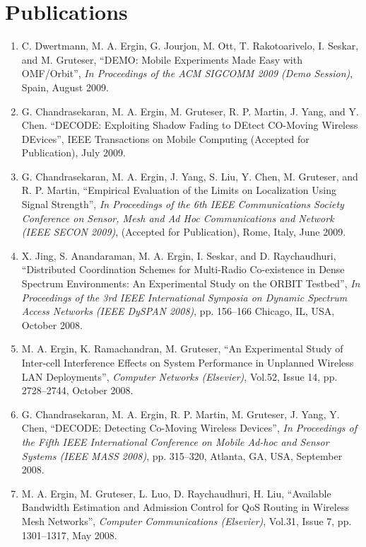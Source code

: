 \documentclass[10pt]{article}
\begin{document}
\section{Publications}
\begin{enumerate}
\item C. Dwertmann, M. A. Ergin, G. Jourjon, M. Ott, T. Rakotoarivelo, I. Seskar, and M. Gruteser, ``DEMO: Mobile Experiments Made Easy with OMF/Orbit'', \emph{In Proceedings of the {ACM SIGCOMM} 2009 (Demo Session)}, Spain, August 2009.

\item G. Chandrasekaran, M. A. Ergin, M. Gruteser, R. P. Martin, J. Yang, and Y. Chen. ``DECODE: Exploiting Shadow Fading to DEtect CO-Moving Wireless DEvices'', {IEEE} Transactions on Mobile Computing (Accepted for Publication), July 2009. 

\item G. Chandrasekaran, M. A. Ergin, J. Yang, S. Liu, Y. Chen, M. Gruteser, and R. P. Martin, ``Empirical Evaluation of the Limits on Localization Using Signal Strength'', \emph{In Proceedings of the 6th IEEE Communications Society Conference on Sensor, Mesh and Ad Hoc Communications and Network (IEEE SECON 2009)}, (Accepted for Publication), Rome, Italy, June 2009.

\item X. Jing, S. Anandaraman, M. A. Ergin, I. Seskar, and
D. Raychaudhuri, ``Distributed Coordination Schemes for Multi-Radio
Co-existence in Dense Spectrum Environments: An Experimental Study on the ORBIT
Testbed'', \emph{In Proceedings of the 3rd IEEE International Symposia on
Dynamic Spectrum Access Networks (IEEE DySPAN 2008)}, pp. 156--166 Chicago, IL,
USA, October 2008.

\item M. A. Ergin, K. Ramachandran, M. Gruteser, ``An Experimental
Study of Inter-cell Interference Effects on System Performance in Unplanned
Wireless LAN Deployments'', \emph{Computer Networks (Elsevier)}, Vol.52,
Issue 14, pp. 2728--2744, October 2008.

\item G. Chandrasekaran, M. A. Ergin, R. P. Martin, M. Gruteser, J. Yang, Y.
Chen, ``DECODE: Detecting Co-Moving Wireless Devices'', \emph{In Proceedings of
the Fifth IEEE International Conference on Mobile Ad-hoc and Sensor Systems
(IEEE MASS 2008)}, pp. 315--320, Atlanta, GA, USA, September 2008.

\item M. A. Ergin, M. Gruteser, L. Luo, D. Raychaudhuri, H. Liu, ``Available
Bandwidth Estimation and Admission Control for QoS Routing in Wireless Mesh
Networks'', \emph{Computer Communications (Elsevier)}, Vol.31, Issue 7, pp.
1301--1317, May 2008.


\end{enumerate}
\end{document}
